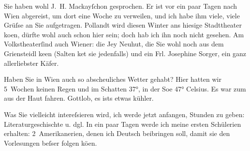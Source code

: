 \pstart
           {\pb}Sie haben wohl J. H. Mackayſchon gesprochen. Er ist vor ein paar Tagen nach
                  Wien abgereist, um dort eine Woche zu
               verweilen, und ich habe ihm viele, viele Grüſse an Sie aufgetragen. Pollandt wird diesen Winter ans hiesige Stadttheater ko{\geminationm}en,
               dürfte wohl auch schon hier sein; doch hab ich ihn noch nicht gesehen. Am Volkstheaterſind auch Wiener: die Je{\geminationn}y
                  Neuhut, die Sie wohl noch aus dem Griensteidl ke{\geminationn}en (Salten ke{\geminationn}t sie jedenfalls) und
               ein Frl. Josephine Sorger, ein ganz
               allerliebster Käfer.\pend
           
\pstart
           Haben Sie in Wien auch so abscheuliches Wetter
               gehabt? Hier hatten wir 5 Wochen keinen Regen und im Schatten 37°, in der So{\geminationn}e 47° Celsius. Es war zum aus der Haut fahren. Gottlob,
               es ists etwas kühler.\pend
           
\pstart
           Was Sie vielleicht intereſsieren wird, ich werde jetzt anfangen, Stunden zu geben:
               Literaturgeschischte u. dgl. In ein paar Tagen werde ich meine ersten Schüleri{\geminationn}en erhalten: 2 Amerikaneri{\geminationn}en, denen ich Deutsch beibringen soll, damit
               sie den Vorlesungen beſser folgen kö{\geminationn}en.\pend
           

